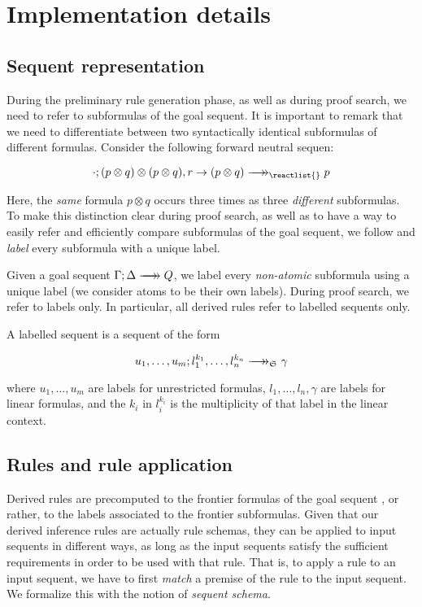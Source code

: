 \section{Implementation details}

\subsection{Sequent representation}

During the preliminary rule generation phase, as well as during proof search, we
need to refer to subformulas of the goal sequent. It is important to remark that
we need to differentiate between two syntactically identical subformulas of
different formulas. Consider the following forward neutral sequen:

\[
  \zfneuseq{\cdot}{(p \otimes q) \otimes (p \otimes q),
    r \rightarrow (p \otimes q)}{\reactlist{}}{p}
\]

Here, the \emph{same} formula $p \otimes q$ occurs three times as three
\emph{different} subformulas. To make this distinction clear during proof
search, as well as to have a way to easily refer and efficiently compare
subformulas of the goal sequent, we follow \cite{chaudhuri-thesis} and
\emph{label} every subformula with a unique label.

Given a goal sequent $\fneuseq{\Gamma}{\Delta}{Q}$, we label every
\emph{non-atomic} subformula using a unique label (we consider atoms to be their
own labels). During proof search, we refer to labels only. In particular, all
derived rules refer to labelled sequents only.

\begin{definition}
  A labelled sequent is a sequent of the form

  \[
    u_1, \dots, u_m ; l_1^{k_1}, \dots, l_n^{k_n} \fneuseqsymb_{\ctrlset{}} \gamma
  \]

  where $u_1, \dots, u_m$ are labels for unrestricted formulas, $l_1, \dots,
  l_n, \gamma$ are labels for linear formulas, and the $k_i$ in $l_i^{k_i}$ is
  the multiplicity of that label in the linear context.
\end{definition}

\subsection{Rules and rule application}

Derived rules are precomputed to the frontier formulas of the goal sequent , or
rather, to the labels associated to the frontier subformulas. Given that our
derived inference rules are actually rule schemas, they can be applied to input
sequents in different ways, as long as the input sequents satisfy the sufficient
requirements in order to be used with that rule. That is, to apply a rule to an
input sequent, we have to first \emph{match} a premise of the rule to the input
sequent. We formalize this with the notion of \emph{sequent schema}.

